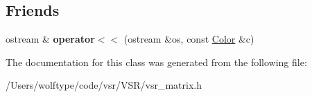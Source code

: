 \subsection*{Friends}
\begin{DoxyCompactItemize}
\item 
\hypertarget{classvsr_1_1_color_a9fbacccb79591c83f4c62d0c65470ac4}{ostream \& {\bfseries operator$<$$<$} (ostream \&os, const \hyperlink{classvsr_1_1_color}{Color} \&c)}\label{classvsr_1_1_color_a9fbacccb79591c83f4c62d0c65470ac4}

\end{DoxyCompactItemize}


The documentation for this class was generated from the following file\-:\begin{DoxyCompactItemize}
\item 
/\-Users/wolftype/code/vsr/\-V\-S\-R/vsr\-\_\-matrix.\-h\end{DoxyCompactItemize}
